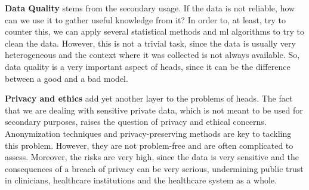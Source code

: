 \textbf{Data Quality} stems from the secondary usage. If the data is not reliable, how can we use it to gather useful knowledge from it? In order to, at least, try to counter this, we can apply several statistical methods and \ac{ml} algorithms to try to clean the data. However, this is not a trivial task, since the data is usually very heterogeneous and the context where it was collected is not always available. So, data quality is a very important aspect of \ac{heads}, since it can be the difference between a good and a bad model.



\textbf{Privacy and ethics} add yet another layer to the problems of \ac{heads}. The fact that we are dealing with sensitive private data, which is not meant to be used for secondary purposes, raises the question of privacy and ethical concerns. Anonymization techniques and privacy-preserving methods are key to tackling this problem. However, they are not problem-free and are often complicated to assess. Moreover, the risks are very high, since the data is very sensitive and the consequences of a breach of privacy can be very serious, undermining public trust in clinicians, healthcare institutions and the healthcare system as a whole.


